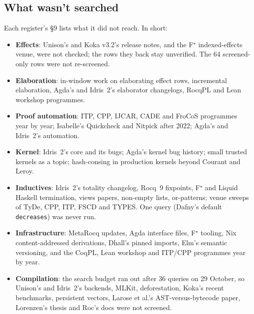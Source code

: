 \documentclass[11pt,a4paper]{article}
\newcommand{\code}[1]{\texttt{#1}}
\begin{document}
\subsection{What wasn't searched}
Each register's \S9 lists what it did not reach. In short:
\begin{itemize}
  \item \textbf{Effects}: Unison's and Koka v3.2's release notes, and the F$^\star$ indexed-effects
        venue, were not checked; the rows they back stay unverified. The 64 screened-only rows
        were not re-screened.
  \item \textbf{Elaboration}: in-window work on elaborating effect rows, incremental elaboration,
        Agda's and Idris~2's elaborator changelogs, RocqPL and Lean workshop programmes.
  \item \textbf{Proof automation}: ITP, CPP, I{}JCAR, CADE and FroCoS programmes year by year;
        Isabelle's Quickcheck and Nitpick after 2022; Agda's and Idris~2's automation.
  \item \textbf{Kernel}: Idris~2's core and its bugs; Agda's kernel bug history; small trusted
        kernels as a topic; hash-consing in production kernels beyond Courant and Leroy.
  \item \textbf{Inductives}: Idris~2's totality changelog, Rocq~9 fixpoints, F$^\star$ and Liquid
        Haskell termination, views papers, non-empty lists, or-patterns; venue sweeps of TyDe,
        CPP, ITP, FSCD and TYPES. One query (Dafny's default \code{decreases}) was never run.
  \item \textbf{Infrastructure}: MetaRocq updates, Agda interface files, F$^\star$ tooling, Nix
        content-addressed derivations, Dhall's pinned imports, Elm's semantic versioning, and the
        CoqPL, Lean workshop and ITP/CPP programmes year by year.
  \item \textbf{Compilation}: the search budget ran out after 36 queries on 29 October, so
        Unison's and Idris~2's backends, MLKit, deforestation, Koka's recent benchmarks,
        persistent vectors, Larose et al.'s AST-versus-bytecode paper, Lorenzen's thesis and Roc's
        docs were not screened.
\end{itemize}
\end{document}
